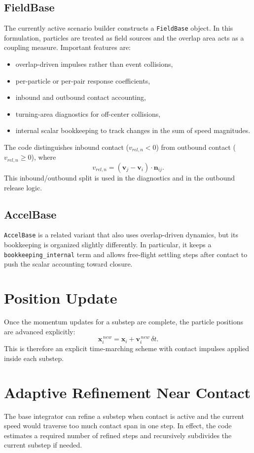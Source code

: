 \documentclass[11pt]{article}
\begin{document}
\subsection{FieldBase}
The currently active scenario builder constructs a \texttt{FieldBase} object. In this formulation, particles are treated as field sources and the overlap area acts as a coupling measure. Important features are:
\begin{itemize}[leftmargin=1.5em]
    \item overlap-driven impulses rather than event collisions,
    \item per-particle or per-pair response coefficients,
    \item inbound and outbound contact accounting,
    \item turning-area diagnostics for off-center collisions,
    \item internal scalar bookkeeping to track changes in the sum of speed magnitudes.
\end{itemize}

The code distinguishes inbound contact ($v_{rel,n} < 0$) from outbound contact ($v_{rel,n} \ge 0$), where
\[
    v_{rel,n} = (\mathbf{v}_j - \mathbf{v}_i)\cdot \mathbf{n}_{ij}.
\]
This inbound/outbound split is used in the diagnostics and in the outbound release logic.

\subsection{AccelBase}
\texttt{AccelBase} is a related variant that also uses overlap-driven dynamics, but its bookkeeping is organized slightly differently. In particular, it keeps a \texttt{bookkeeping\_internal} term and allows free-flight settling steps after contact to push the scalar accounting toward closure.

\section{Position Update}
Once the momentum updates for a substep are complete, the particle positions are advanced explicitly:
\[
    \mathbf{x}_i^{\,new} = \mathbf{x}_i + \mathbf{v}_i^{\,new}\,\delta t.
\]
This is therefore an explicit time-marching scheme with contact impulses applied inside each substep.

\section{Adaptive Refinement Near Contact}
The base integrator can refine a substep when contact is active and the current speed would traverse too much contact span in one step. In effect, the code estimates a required number of refined steps and recursively subdivides the current substep if needed.
\end{document}
